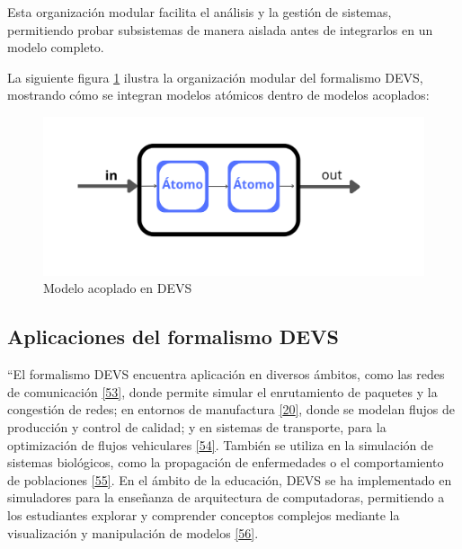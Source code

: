 \documentclass[12pt,oneside]{templates/unerthesis}
\begin{document}
Esta organización modular facilita el análisis y la gestión de sistemas, permitiendo probar subsistemas de manera aislada antes de integrarlos en un modelo completo.

La siguiente figura \ref{fig:acoplado} ilustra la organización modular del formalismo DEVS, mostrando cómo se integran modelos atómicos dentro de modelos acoplados:

\begin{figure}

{\centering \includegraphics[width=1\linewidth]{images/acoplado} 

}

\caption{Modelo acoplado en DEVS}\label{fig:acoplado}
\end{figure}

\hypertarget{aplicaciones-del-formalismo-devs}{%
\subsection{Aplicaciones del formalismo DEVS}\label{aplicaciones-del-formalismo-devs}}

``El formalismo DEVS encuentra aplicación en diversos ámbitos, como las redes de comunicación \protect\hyperlink{ref-fujimoto2001parallel}{{[}53{]}}, donde permite simular el enrutamiento de paquetes y la congestión de redes; en entornos de manufactura \protect\hyperlink{ref-zeigler_theory_2000}{{[}20{]}}, donde se modelan flujos de producción y control de calidad; y en sistemas de transporte, para la optimización de flujos vehiculares \protect\hyperlink{ref-barros1997modeling}{{[}54{]}}. También se utiliza en la simulación de sistemas biológicos, como la propagación de enfermedades o el comportamiento de poblaciones \protect\hyperlink{ref-zeigler2004continuity}{{[}55{]}}. En el ámbito de la educación, DEVS se ha implementado en simuladores para la enseñanza de arquitectura de computadoras, permitiendo a los estudiantes explorar y comprender conceptos complejos mediante la visualización y manipulación de modelos \protect\hyperlink{ref-calvo2010simulador}{{[}56{]}}.
\end{document}

